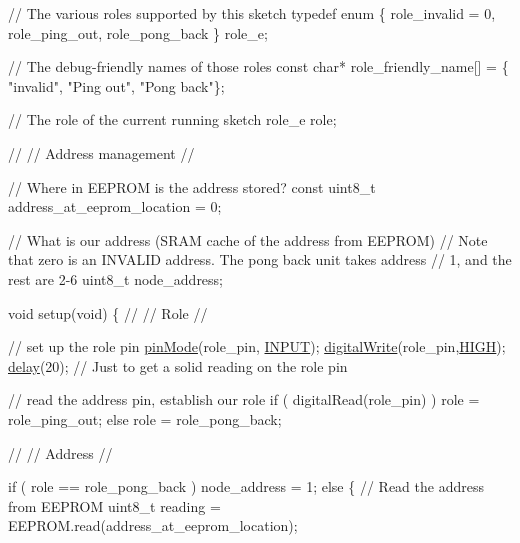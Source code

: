 \begin{DoxyCodeInclude}
\textcolor{comment}{// The various roles supported by this sketch}
\textcolor{keyword}{typedef} \textcolor{keyword}{enum} \{ role\_invalid = 0, role\_ping\_out, role\_pong\_back \} role\_e;

\textcolor{comment}{// The debug-friendly names of those roles}
\textcolor{keyword}{const} \textcolor{keywordtype}{char}* role\_friendly\_name[] = \{ \textcolor{stringliteral}{"invalid"}, \textcolor{stringliteral}{"Ping out"}, \textcolor{stringliteral}{"Pong back"}\};

\textcolor{comment}{// The role of the current running sketch}
role\_e role;

\textcolor{comment}{//}
\textcolor{comment}{// Address management}
\textcolor{comment}{//}

\textcolor{comment}{// Where in EEPROM is the address stored?}
\textcolor{keyword}{const} uint8\_t address\_at\_eeprom\_location = 0;

\textcolor{comment}{// What is our address (SRAM cache of the address from EEPROM)}
\textcolor{comment}{// Note that zero is an INVALID address.  The pong back unit takes address}
\textcolor{comment}{// 1, and the rest are 2-6}
uint8\_t node\_address;

\textcolor{keywordtype}{void} setup(\textcolor{keywordtype}{void})
\{
  \textcolor{comment}{//}
  \textcolor{comment}{// Role}
  \textcolor{comment}{//}

  \textcolor{comment}{// set up the role pin}
  \hyperlink{group__Porting__General_ga361649efb4f1e2fa3c870ca203497d5e}{pinMode}(role\_pin, \hyperlink{group__Porting__General_ga1bb283bd7893b9855e2f23013891fc82}{INPUT});
  \hyperlink{group__Porting__General_gabda89b115581947337690b2f85bfab6e}{digitalWrite}(role\_pin,\hyperlink{group__Porting__General_ga5bb885982ff66a2e0a0a45a8ee9c35e2}{HIGH});
  \hyperlink{group__Porting__General_ga70a331e8ddf9acf9d33c47b71cda4c5f}{delay}(20); \textcolor{comment}{// Just to get a solid reading on the role pin}

  \textcolor{comment}{// read the address pin, establish our role}
  \textcolor{keywordflow}{if} ( digitalRead(role\_pin) )
    role = role\_ping\_out;
  \textcolor{keywordflow}{else}
    role = role\_pong\_back;

  \textcolor{comment}{//}
  \textcolor{comment}{// Address}
  \textcolor{comment}{//}

  \textcolor{keywordflow}{if} ( role == role\_pong\_back )
    node\_address = 1;
  \textcolor{keywordflow}{else}
  \{
    \textcolor{comment}{// Read the address from EEPROM}
    uint8\_t reading = EEPROM.read(address\_at\_eeprom\_location);


\end{DoxyCodeInclude}
